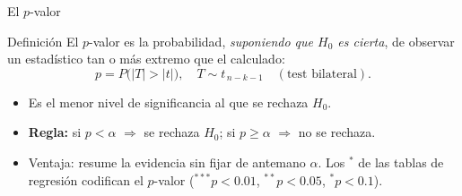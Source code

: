 \documentclass{beamer}
\begin{document}
\begin{frame}{El $p$-valor}
\begin{block}{Definición}
El $p$-valor es la probabilidad, \emph{suponiendo que $H_0$ es cierta}, de observar un estadístico tan o más extremo que el calculado:
\[
p = P\big(|T| > |t|\big), \quad T\sim t_{\,n-k-1} \quad (\text{test bilateral}).
\]
\end{block}
\begin{itemize}
    \item Es el menor nivel de significancia al que se rechaza $H_0$.
    \pause
    \item \textbf{Regla:} si $p < \alpha$ $\Rightarrow$ se rechaza $H_0$; si $p \geq \alpha$ $\Rightarrow$ no se rechaza.
    \pause
    \item Ventaja: resume la evidencia sin fijar de antemano $\alpha$. Los $^{*}$ de las tablas de regresión codifican el $p$-valor ($^{***}p<0.01$, $^{**}p<0.05$, $^{*}p<0.1$).
\end{itemize}
\end{frame}
\end{document}
